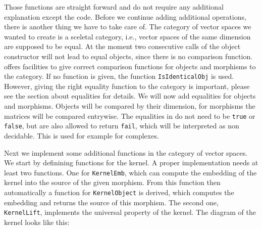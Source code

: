Those functions are straight forward and do not require any additional explanation except the code. Before we continue
adding additional operations, there is another thing we have to take care of. The category of vector spaces we wanted
to create is a sceletal category, i.e., vector spaces of the same dimension are supposed to be equal. At the moment
two consecutive calls of the object constructor will not lead to equal objects, since there is no comparison function.
\CapPkg offers facilities to give correct comparison functions for objects and morphisms to the category. If no function
is given, the \GAP function \texttt{IsIdenticalObj} is used. However, giving the right equality function to the
category is important, please see the  section about equalities for details. We will now add equalities
for objects and morphisms. Objects will be compared by their dimension, for morphisms the matrices will be compared entrywise.
The equalities in \CapPkg do not need to be \texttt{true} or \texttt{false}, but are also allowed to return \texttt{fail},
which will be interpreted as non decidable. This is used for example for complexes.



Next we implement some additional functions in the category of vector spaces. We start by definining functions for the kernel.
A proper implementation needs at least two functions. One for \texttt{KernelEmb}, which can compute the embedding of the kernel
into the source of the given morphism. From this function then automatically a function for \texttt{KernelObject} is derived, which
computes the embedding and returns the source of this morphism. The second one, \texttt{KernelLift}, implements the universal property of the kernel.
The diagram of the kernel looks like this:
\begin{center}
\end{center}

